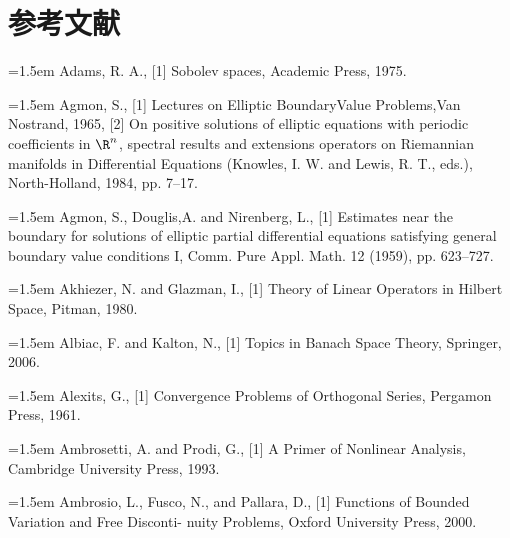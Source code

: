 
\chapter*{参考文献}

\noindent\small

\noindent\hangindent=1.5em Adams, R. A., \hypertarget{ref:Adams-1}{[1]} Sobolev spaces, Academic Press, 1975.\par{}
\noindent\hangindent=1.5em Agmon, S., \hypertarget{ref:Agmon-1}{[1]} Lectures on Elliptic BoundaryValue Problems,Van Nostrand, 1965, \hypertarget{ref:Agmon-2}{[2]} On positive solutions of elliptic equations with periodic coefficients in $\R^n$, spectral results and extensions operators on Riemannian manifolds in Differential Equations (Knowles, I. W. and Lewis, R. T., eds.), North-Holland, 1984, pp. 7--17.\par{}
\noindent\hangindent=1.5em Agmon, S., Douglis,A. and Nirenberg, L., \hypertarget{ref:AgmonDouglisNirenberg-1}{[1]} Estimates near the boundary for solutions of elliptic partial differential equations satisfying general boundary value conditions I, Comm. Pure Appl. Math. 12 (1959), pp. 623--727.\par{}
\noindent\hangindent=1.5em Akhiezer, N. and Glazman, I., \hypertarget{ref:AkhiezerGlazman-1}{[1]} Theory of Linear Operators in Hilbert Space, Pitman, 1980.\par{}
\noindent\hangindent=1.5em Albiac, F. and Kalton, N., \hypertarget{ref:Albiac-1}{[1]} Topics in Banach Space Theory, Springer, 2006.\par{}
\noindent\hangindent=1.5em Alexits, G., \hypertarget{ref:Alexits-1}{[1]} Convergence Problems of Orthogonal Series, Pergamon Press, 1961.\par{}
\noindent\hangindent=1.5em Ambrosetti, A. and Prodi, G., \hypertarget{ref:AmbrosettiProdi-1}{[1]} A Primer of Nonlinear Analysis, Cambridge University Press, 1993.\par{}
\noindent\hangindent=1.5em Ambrosio, L., Fusco, N., and Pallara, D., \hypertarget{ref:Ambrosio-1}{[1]} Functions of Bounded Variation and Free Disconti- nuity Problems, Oxford University Press, 2000.\par{}
